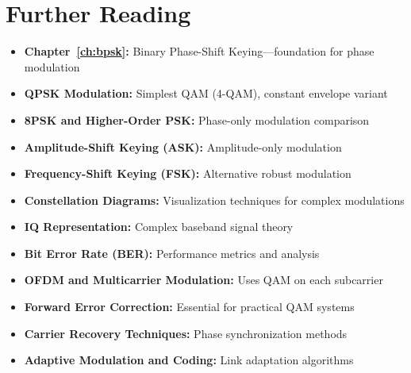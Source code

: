 \section{Further Reading}

\begin{itemize}
\item \textbf{Chapter~\ref{ch:bpsk}:} Binary Phase-Shift Keying---foundation for phase modulation
\item \textbf{QPSK Modulation:} Simplest QAM (4-QAM), constant envelope variant
\item \textbf{8PSK and Higher-Order PSK:} Phase-only modulation comparison
\item \textbf{Amplitude-Shift Keying (ASK):} Amplitude-only modulation
\item \textbf{Frequency-Shift Keying (FSK):} Alternative robust modulation
\item \textbf{Constellation Diagrams:} Visualization techniques for complex modulations
\item \textbf{IQ Representation:} Complex baseband signal theory
\item \textbf{Bit Error Rate (BER):} Performance metrics and analysis
\item \textbf{OFDM and Multicarrier Modulation:} Uses QAM on each subcarrier
\item \textbf{Forward Error Correction:} Essential for practical QAM systems
\item \textbf{Carrier Recovery Techniques:} Phase synchronization methods
\item \textbf{Adaptive Modulation and Coding:} Link adaptation algorithms
\end{itemize}
